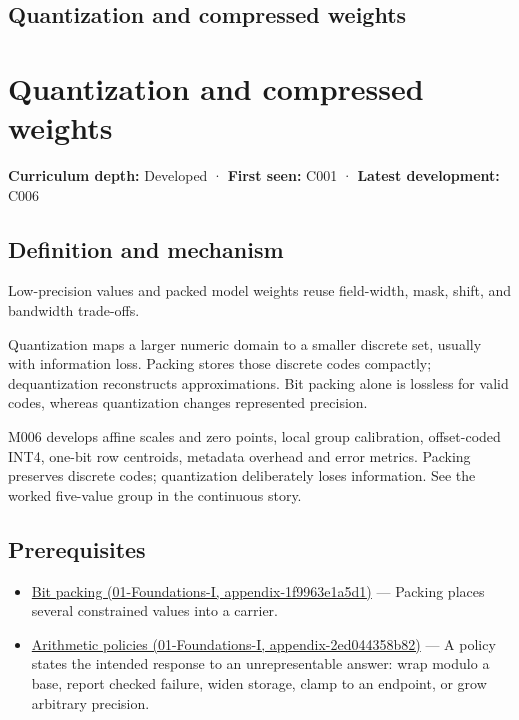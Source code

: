 \hypertarget{appendix-fdc7879e8bf2}{}
\section*{Quantization and compressed weights}
\chapter{Quantization and compressed weights}\label{appendix-fdc7879e8bf2-quantization-and-compressed-weights}

\textbf{Curriculum depth:} Developed · \textbf{First seen:} C001 · \textbf{Latest development:} C006

\section{Definition and mechanism}\label{appendix-fdc7879e8bf2-definition-and-mechanism}

Low-precision values and packed model weights reuse field-width, mask, shift, and bandwidth trade-offs.

Quantization maps a larger numeric domain to a smaller discrete set, usually with information loss. Packing stores those discrete codes compactly; dequantization reconstructs approximations. Bit packing alone is lossless for valid codes, whereas quantization changes represented precision.

M006 develops affine scales and zero points, local group calibration, offset-coded INT4, one-bit row centroids, metadata overhead and error metrics. Packing preserves discrete codes; quantization deliberately loses information. See the worked five-value group in the continuous story.

\section{Prerequisites}\label{appendix-fdc7879e8bf2-prerequisites}

\begin{itemize}
\tightlist
\item
  \href{../01-Foundations-I/main.pdf\#nameddest=appendix-1f9963e1a5d1}{Bit packing (01-Foundations-I, appendix-1f9963e1a5d1)} --- Packing places several constrained values into a carrier.
\item
  \href{../01-Foundations-I/main.pdf\#nameddest=appendix-2ed044358b82}{Arithmetic policies (01-Foundations-I, appendix-2ed044358b82)} --- A policy states the intended response to an unrepresentable answer: wrap modulo a base, report checked failure, widen storage, clamp to an endpoint, or grow arbitrary precision.
\end{itemize}

